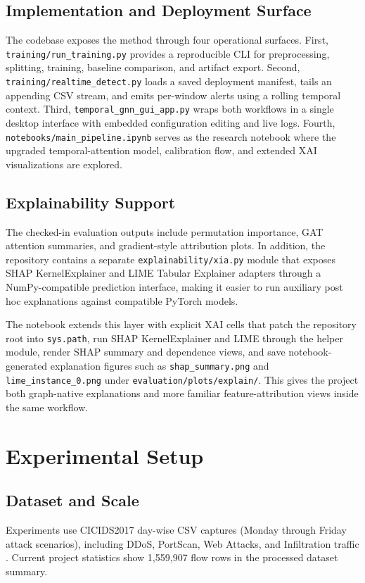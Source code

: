 \documentclass[conference]{IEEEtran}
\begin{document}
\subsection{Implementation and Deployment Surface}
The codebase exposes the method through four operational surfaces. First, \texttt{training/run\_training.py} provides a reproducible CLI for preprocessing, splitting, training, baseline comparison, and artifact export. Second, \texttt{training/realtime\_detect.py} loads a saved deployment manifest, tails an appending CSV stream, and emits per-window alerts using a rolling temporal context. Third, \texttt{temporal\_gnn\_gui\_app.py} wraps both workflows in a single desktop interface with embedded configuration editing and live logs. Fourth, \texttt{notebooks/main\_pipeline.ipynb} serves as the research notebook where the upgraded temporal-attention model, calibration flow, and extended XAI visualizations are explored.

\subsection{Explainability Support}
The checked-in evaluation outputs include permutation importance, GAT attention summaries, and gradient-style attribution plots. In addition, the repository contains a separate \texttt{explainability/xia.py} module that exposes SHAP KernelExplainer and LIME Tabular Explainer adapters through a NumPy-compatible prediction interface, making it easier to run auxiliary post hoc explanations against compatible PyTorch models.

The notebook extends this layer with explicit XAI cells that patch the repository root into \texttt{sys.path}, run SHAP KernelExplainer and LIME through the helper module, render SHAP summary and dependence views, and save notebook-generated explanation figures such as \texttt{shap\_summary.png} and \texttt{lime\_instance\_0.png} under \texttt{evaluation/plots/explain/}. This gives the project both graph-native explanations and more familiar feature-attribution views inside the same workflow.

\section{Experimental Setup}
\subsection{Dataset and Scale}
Experiments use CICIDS2017 day-wise CSV captures (Monday through Friday attack scenarios), including DDoS, PortScan, Web Attacks, and Infiltration traffic \cite{sharafaldin2018cicids}. Current project statistics show 1,559,907 flow rows in the processed dataset summary.
\end{document}
